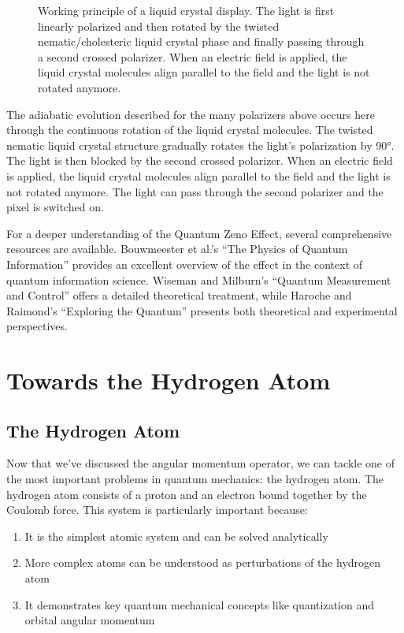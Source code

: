 \documentclass[
  a4paper,
]{book}
\providecommand{\tightlist}{%
  \setlength{\itemsep}{0pt}\setlength{\parskip}{0pt}}
\begin{document}
\begin{figure}
\caption{\label{fig-lc}Working principle of a liquid crystal display.
The light is first linearly polarized and then rotated by the twisted
nematic/cholesteric liquid crystal phase and finally passing through a
second crossed polarizer. When an electric field is applied, the liquid
crystal molecules align parallel to the field and the light is not
rotated anymore.}

\end{figure}%

The adiabatic evolution described for the many polarizers above occurs
here through the continuous rotation of the liquid crystal molecules.
The twisted nematic liquid crystal structure gradually rotates the
light's polarization by 90°. The light is then blocked by the second
crossed polarizer. When an electric field is applied, the liquid crystal
molecules align parallel to the field and the light is not rotated
anymore. The light can pass through the second polarizer and the pixel
is switched on.

For a deeper understanding of the Quantum Zeno Effect, several
comprehensive resources are available. Bouwmeester et al.'s ``The
Physics of Quantum Information'' provides an excellent overview of the
effect in the context of quantum information science. Wiseman and
Milburn's ``Quantum Measurement and Control'' offers a detailed
theoretical treatment, while Haroche and Raimond's ``Exploring the
Quantum'' presents both theoretical and experimental perspectives.

\chapter{Towards the Hydrogen Atom}\label{towards-the-hydrogen-atom}

\section{The Hydrogen Atom}\label{the-hydrogen-atom}

Now that we've discussed the angular momentum operator, we can tackle
one of the most important problems in quantum mechanics: the hydrogen
atom. The hydrogen atom consists of a proton and an electron bound
together by the Coulomb force. This system is particularly important
because:

\begin{enumerate}
\def\labelenumi{\arabic{enumi}.}
\tightlist
\item
  It is the simplest atomic system and can be solved analytically
\item
  More complex atoms can be understood as perturbations of the hydrogen
  atom
\item
  It demonstrates key quantum mechanical concepts like quantization and
  orbital angular momentum
\end{enumerate}
\end{document}
